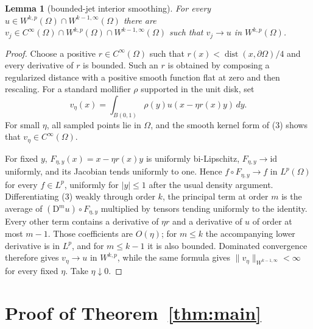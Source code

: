 \documentclass[11pt]{article}
\newtheorem{lemma}[theorem]{Lemma}
\newcommand{\Om}{\Omega}
\newcommand{\D}{\mathrm D}
\begin{document}
\begin{lemma}[bounded-jet interior smoothing]\label{lem:smooth}
For every $u\in W^{k,p}(\Om)\cap W^{k-1,\infty}(\Om)$ there are
$v_j\in C^\infty(\Om)\cap W^{k,p}(\Om)\cap W^{k-1,\infty}(\Om)$ such that
$v_j\to u$ in $W^{k,p}(\Om)$.
\end{lemma}

\begin{proof}
Choose a positive $r\in C^\infty(\Om)$ such that
$r(x)<\operatorname{dist}(x,\partial\Om)/4$ and every derivative of $r$ is
bounded.  Such an $r$ is obtained by composing a regularized distance with a
positive smooth function flat at zero and then rescaling.  For a standard
mollifier $\rho$ supported in the unit disk, set
\[
 v_\eta(x)=\int_{B(0,1)}\rho(y)u(x-\eta r(x)y)\,dy.              \tag{3}
\]
For small $\eta$, all sampled points lie in $\Om$, and the smooth kernel form
of (3) shows that $v_\eta\in C^\infty(\Om)$.

For fixed $y$, $F_{\eta,y}(x)=x-\eta r(x)y$ is uniformly bi-Lipschitz,
$F_{\eta,y}\to\mathrm{id}$ uniformly, and its Jacobian tends uniformly to
one.  Hence $f\circ F_{\eta,y}\to f$ in $L^p(\Om)$ for every $f\in L^p$,
uniformly for $|y|\leq1$ after the usual density argument.  Differentiating
(3) weakly through order $k$, the principal term at order $m$ is the average
of $(\D^m u)\circ F_{\eta,y}$ multiplied by tensors tending uniformly to the
identity.  Every other term contains a derivative of $\eta r$ and a derivative
of $u$ of order at most $m-1$.  Those coefficients are $O(\eta)$; for
$m\leq k$ the accompanying lower derivative is in $L^p$, and for
$m\leq k-1$ it is also bounded.  Dominated convergence therefore gives
$v_\eta\to u$ in $W^{k,p}$, while the same formula gives
$\|v_\eta\|_{W^{k-1,\infty}}<\infty$ for every fixed $\eta$.  Take
$\eta\downarrow0$.
\end{proof}

\section{Proof of Theorem~\ref{thm:main}}
\end{document}
